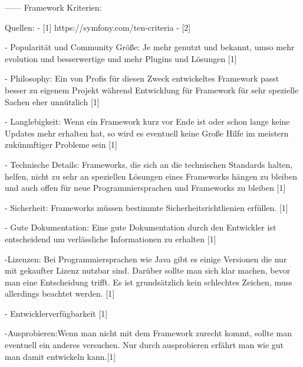 ------
Framework Kriterien:

Quellen:
- [1] https://symfony.com/ten-criteria
- [2]


- Popularität und Community Größe: Je mehr genutzt und bekannt, umso mehr evolution und besserwertige und mehr Plugins und Lösungen [1]

- Philosophy: Ein von Profis für diesen Zweck entwickeltes Framework passt besser zu eigenem Projekt während Entwicklung für Framework für sehr spezielle Sachen eher unnützlich [1]

- Langlebigkeit: Wenn ein Framework kurz vor Ende ist oder schon lange keine Updates mehr erhalten hat, so wird es eventuell keine Große Hilfe im meistern zukünmftiger Probleme sein [1]

- Technische Details: Frameworks, die sich an die technischen Standards halten, helfen, nicht zu sehr an speziellen Lösungen eines Frameworks hängen zu bleiben und auch offen für neue Programmiersprachen und Frameworks zu bleiben [1]

- Sicherheit: Frameworks müssen bestimmte Sicherheitsrichtlienien erfüllen. [1]

- Gute Dokumentation: Eine gute Dokumentation durch den Entwickler ist entscheidend um verlässliche Informationen zu erhalten [1]

-Lizenzen: Bei Programmiersprachen wie Java gibt es einige Versionen die nur mit gekaufter Lizenz nutzbar sind. Darüber sollte man sich klar machen, bevor man eine Entscheidung trifft. Es ist grundsätzlich kein schlechtes Zeichen, muss allerdings beachtet werden. [1]

- Entwicklerverfügbarkeit [1]

-Ausprobieren:Wenn man nicht mit dem Framework zurecht kommt, sollte man eventuell ein anderes versuchen. Nur durch ausprobieren erfährt man wie gut man damit entwickeln kann.[1]

